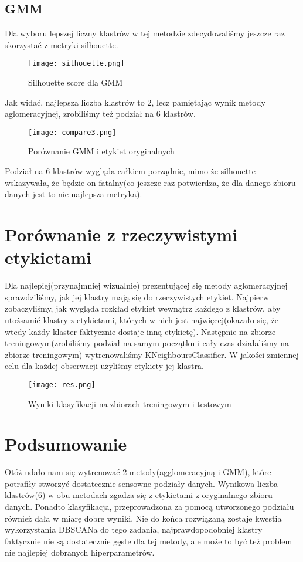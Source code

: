 \documentclass[14pt]{article}
\begin{document}
\subsection*{GMM}
Dla wyboru lepszej liczny klastrów w tej metodzie zdecydowaliśmy jeszcze raz skorzystać z metryki silhouette.

\begin{figure}[!htp]
    \centering
    \texttt{[image: silhouette.png]}
    \caption{Silhouette score dla GMM}
\end{figure}
\noindent
Jak widać, najlepsza liczba klastrów to 2, lecz pamiętając wynik metody aglomeracyjnej, zrobiliśmy też podział na 6 klastrów.
\newpage
\begin{figure}[!htp]
    \centering
    \texttt{[image: compare3.png]}
    \caption{Porównanie GMM i etykiet oryginalnych}
\end{figure}
\noindent
Podział na 6 klastrów wygląda całkiem porządnie, mimo że silhouette wskazywała, że będzie on fatalny(co jeszcze raz potwierdza, że dla danego zbioru danych jest to nie najlepsza metryka).
\section*{Porównanie z rzeczywistymi etykietami}
Dla najlepiej(przynajmniej wizualnie) prezentującej się metody aglomeracyjnej sprawdziliśmy, jak jej klastry mają się do rzeczywistych etykiet. Najpierw zobaczyliśmy, jak wygląda rozkład etykiet wewnątrz każdego z klastrów, aby utożsamić klastry z etykietami, których w nich jest najwięcej(okazało się, że wtedy każdy klaster faktycznie dostaje inną etykietę). Następnie na zbiorze treningowym(zrobiliśmy podział na samym początku i cały czas działaliśmy na zbiorze treningowym) wytrenowaliśmy KNeighboursClassifier. W jakości zmiennej celu dla każdej obserwacji użyliśmy etykiety jej klastra.

\begin{figure}[!htp]
    \centering
    \texttt{[image: res.png]}
    \caption{Wyniki klasyfikacji na zbiorach treningowym i testowym}
\end{figure}

\section*{Podsumowanie}
Otóż udało nam się wytrenować 2 metody(agglomeracyjną i GMM), które potrafiły stworzyć dostatecznie sensowne podziały danych. Wynikowa liczba klastrów(6) w obu metodach zgadza się z etykietami z oryginalnego zbioru danych. Ponadto klasyfikacja, przeprowadzona za pomocą utworzonego podziału również dała w miarę dobre wyniki. Nie do końca rozwiązaną zostaje kwestia wykorzystania DBSCANa do tego zadania, najprawdopodobniej klastry faktycznie nie są dostatecznie gęste dla tej metody, ale może to być też problem nie najlepiej dobranych hiperparametrów.
\end{document}
